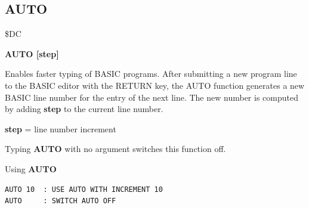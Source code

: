 
\newpage
\subsection{AUTO}
\begin{description}[leftmargin=2cm,style=nextline]
\item [Token:] \$DC
\item [Format:]
  {\bf AUTO [step]}
\item [Usage:] Enables faster typing of BASIC programs.
  After submitting a new program line to the BASIC editor with
  the RETURN key, the AUTO function generates a new BASIC line
  number for the entry of the next line. The new number is
  computed by adding {\bf step} to the current line number.

  {\bf step} = line number increment

  Typing {\bf AUTO} with no argument switches this function off.

\item [Example:] Using {\bf AUTO}
\begin{tcolorbox}[colback=black,coltext=white]
\verbatimfont{\codefont}
\begin{verbatim}
AUTO 10  : USE AUTO WITH INCREMENT 10
AUTO     : SWITCH AUTO OFF
\end{verbatim}
\end{tcolorbox}
\end{description}


\newpage
